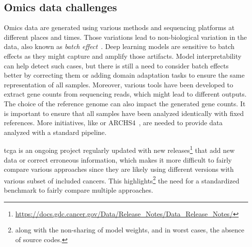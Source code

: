 \documentclass[../main.tex]{subfiles}
\begin{document}
	\subsection{Omics data challenges}
		Omics data are generated using various methods and sequencing platforms at different places and times.
		Those variations lead to non-biological variation in the data, also known as \emph{batch effect}~\cite{Leek2010}.
		Deep learning models are sensitive to batch effects as they might capture and amplify those artifacts.
		Model interpretability can help detect such cases, but there is still a need to consider batch effects better by correcting them or adding domain adaptation tasks to ensure the same representation of all samples.
		Moreover, various tools have been developed to extract gene counts from sequencing reads, which might lead to different outputs.
		The choice of the reference genome can also impact the generated gene counts.
		It is important to ensure that all samples have been analyzed identically with fixed references.
		More initiatives, like  or ARCHS4~\cite{Lachmann2018}, are needed to provide data analyzed with a standard pipeline.

		\Gls{tcga} is an ongoing project regularly updated with new releases\footnote{\url{https://docs.gdc.cancer.gov/Data/Release_Notes/Data_Release_Notes/}} that add new data or correct erroneous information, which makes it more difficult to fairly compare various approaches since they are likely using different versions with various subset of included cancers.
		This highlights\footnote{along with the non-sharing of model weights, and in worst cases, the absence of source codes.} the need for a standardized benchmark to fairly compare multiple approaches.
\end{document}
